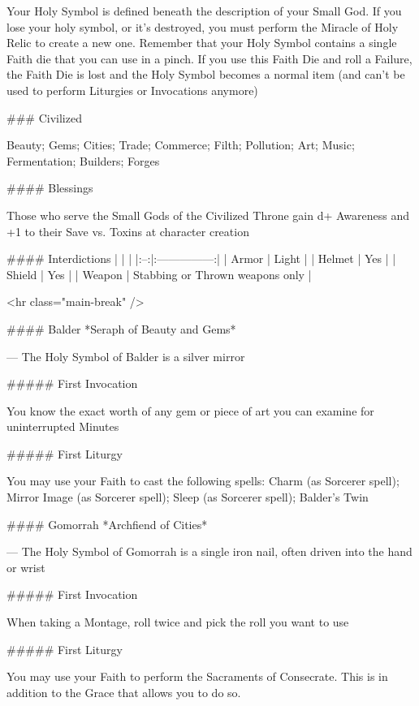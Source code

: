 Your Holy Symbol is defined beneath the description of your Small God.  If you lose your holy symbol, or it's destroyed, you must perform the Miracle of Holy Relic to create a new one.  Remember that your Holy Symbol contains a single Faith die that you can use in a pinch.  If you use this Faith Die and roll a Failure, the Faith Die is lost and the Holy Symbol becomes a normal item (and can't be used to perform Liturgies or Invocations anymore)



### Civilized



Beauty; Gems; Cities; Trade; Commerce; Filth; Pollution; Art; Music; Fermentation; Builders; Forges



#### Blessings

Those who serve the Small Gods of the Civilized Throne gain {d+} Awareness and +1 to their Save vs. Toxins at character creation

#### Interdictions
| | |
|:--:|:---------------:|
| Armor | Light |
| Helmet | Yes |
| Shield | Yes |
| Weapon | Stabbing or Thrown weapons only |

<hr class="main-break" />



#### Balder
*Seraph of Beauty and Gems*

---
The Holy Symbol of Balder is a silver mirror

##### First Invocation

You know the exact worth of any gem or piece of art you can examine for uninterrupted Minutes

##### First Liturgy

You may use your Faith to cast the following spells: Charm (as Sorcerer spell); Mirror Image (as Sorcerer spell); Sleep (as Sorcerer spell);  Balder's Twin




#### Gomorrah
*Archfiend of Cities*

---
The Holy Symbol of Gomorrah is a single iron nail, often driven into the hand or wrist

##### First Invocation

When taking a Montage, roll twice and pick the roll you want to use

##### First Liturgy

You may use your Faith to perform the Sacraments of Consecrate. This is in addition to the Grace that allows you to do so.




